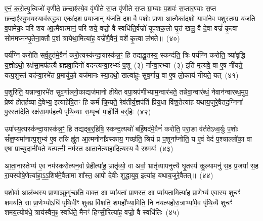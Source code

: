 ए॒नं॒ क॒रो॒त्यृ॒त्विजो॑ वृणीते॒ छन्दाꣴ॑स्ये॒व वृ॑णीते स॒प्त वृ॑णीते स॒प्त ग्रा॒म्याः प॒शवः॑ स॒प्तार॒ण्याः स॒प्त छन्दाꣴ॑स्यु॒भय॒स्याव॑रुद्ध्या॒ एका॑\-दश प्रया॒जान् य॑जति॒ दश॒ वै प॒शोः प्रा॒णा आ॒त्मैका॑द॒शो यावा॑ने॒व प॒शुस्तम्प्र य॑जति व॒पामेकः॒ परि॑ शय आ॒त्मैवात्मानं॒ परि॑ शये॒ वज्रो॒ वै स्वधि॑ति॒र्वज्रो॑ यूपशक॒लो घृ॒तं खलु॒ वै दे॒वा वज्रं॑ कृ॒त्वा सोम॑मघ्नन्घृ॒तेना॒क्तौ प॒शं त्रा॑येथा॒मित्या॑ह॒ वज्रे॑णै॒वैनं॒ वशे॑ कृ॒त्वा ल॑भते॥~(४०)

{\anuvakamend[{आ॒घा॒रम्प॑द्यन्ते॒ द्वाद॑शा॒त्मन्ने॒व य॒ज्ञस्य॒ मेध्य॑मे॒व खलु॒ वा अ॒ष्टाद॑श च}]}%

पर्य॑ग्नि करोति सर्व॒हुत॑मे॒वैनं॑ करो॒त्यस्क॑न्दा॒यास्क॑न्न॒ꣳ॒ हि तद्यद्धु॒तस्य॒ स्कन्द॑ति॒ त्रिः पर्य॑ग्नि करोति॒ त्र्या॑वृ॒द्धि य॒ज्ञो\-ऽथो॒ रक्ष॑सा॒मप॑हत्यै ब्रह्मवा॒दिनो॑ वदन्त्यन्वा॒रभ्यः॑ प॒शू~(३) र्नान्वा॒रभ्या~(३) इति॑ मृ॒त्यवे॒ वा ए॒ष नी॑यते॒ यत्प॒शुस्तं यद॑न्वा॒रभे॑त प्र॒मायु॑को॒ यज॑मानः स्या॒दथो॒ खल्वा॑हुः सुव॒र्गाय॒ वा ए॒ष लो॒काय॑ नीयते॒ यत्~(४१)

प॒शुरिति॒ यन्नान्वा॒रभे॑त सुव॒र्गाल्लो॒काद्यज॑मानो हीयेत वपा॒श्रप॑णीभ्याम॒न्वार॑भते॒ तन्नेवा॒न्वार॑ब्धं॒ नेवान॑न्वारब्ध॒मुप॒ प्रेष्य॑ होतर्\mbox{}ह॒व्या दे॒वेभ्य॒ इत्या॑हेषि॒तꣳ हि कर्म॑ क्रि॒यते॒ रेव॑तीर्य॒ज्ञप॑तिं प्रिय॒धा वि॑श॒तेत्या॑ह यथाय॒जुरे॒वैतद॒ग्निना॑ पु॒रस्ता॑देति॒ रक्ष॑सा॒मप॑हत्यै पृथि॒व्याः स॒म्पृचः॑ पा॒हीति॑ ब॒र्॒\mbox{}हिः~(४२)

उपा᳚स्य॒त्यस्क॑न्दा॒यास्क॑न्न॒ꣳ॒ हि तद्यद्ब॒र्॒\mbox{}हिषि॒ स्कन्द॒त्यथो॑ बर्\mbox{}हि॒षद॑मे॒वैनं॑ करोति॒ परा॒ङा व॑र्तते\-ऽध्व॒र्युः प॒शोः सं᳚ज्ञ॒प्यमा॑नात्प॒शुभ्य॑ ए॒व तन्नि ह्नु॑त आ॒त्मनोना᳚व्रस्काय॒ गच्छ॑ति॒ श्रियं प्र प॒शूना᳚प्नोति॒ य ए॒वं वेद॑ प॒श्चाल्लो॑का॒ वा ए॒षा प्राच्यु॒दानी॑यते॒ यत्पत्नी॒ नम॑स्त आता॒नेत्या॑हादि॒त्यस्य॒ वै र॒श्मयः॑~(४३)

आ॒ता॒नास्तेभ्य॑ ए॒व नम॑स्करोत्यन॒र्वा प्रेहीत्या॑ह॒ भ्रातृ॑व्यो॒ वा अर्वा॒ भ्रातृ॑व्यापनुत्त्यै घृ॒तस्य॑ कु॒ल्यामनु॑ स॒ह प्र॒जया॑ स॒ह रा॒यस्पोषे॒णेत्या॑हा॒ऽ॒ऽ॒शिष॑मे॒वैतामा शा᳚स्त॒ आपो॑ देवीः शुद्धायुव॒ इत्या॑ह यथाय॒जुरे॒वैतत्॥~(४४)

{\anuvakamend[{लो॒काय॑ नीयते॒ यद्ब॒र्॒\mbox{}ही र॒श्मयः॑ स॒प्तत्रिꣳ॑शच्च}]}%

प॒शोर्वा आल॑ब्धस्य प्रा॒णाञ्छुगृ॑च्छति॒ वाक्त॒ आ प्या॑यतां प्रा॒णस्त॒ आ प्या॑यता॒मित्या॑ह प्रा॒णेभ्य॑ ए॒वास्य॒ शुचꣳ॑ शमयति॒ सा प्रा॒णेभ्यो\-ऽधि॑ पृथि॒वीꣳ शुक्प्र वि॑शति॒ शमहो᳚भ्या॒मिति॒ नि न॑यत्यहोरा॒त्राभ्या॑मे॒व पृ॑थि॒व्यै शुचꣳ॑ शमय॒त्योष॑धे॒ त्राय॑स्वैन॒ꣴ॒ स्वधि॑ते॒ मैनꣳ॑ हिꣳसी॒रित्या॑ह॒ वज्रो॒ वै स्वधि॑तिः~(४५)

